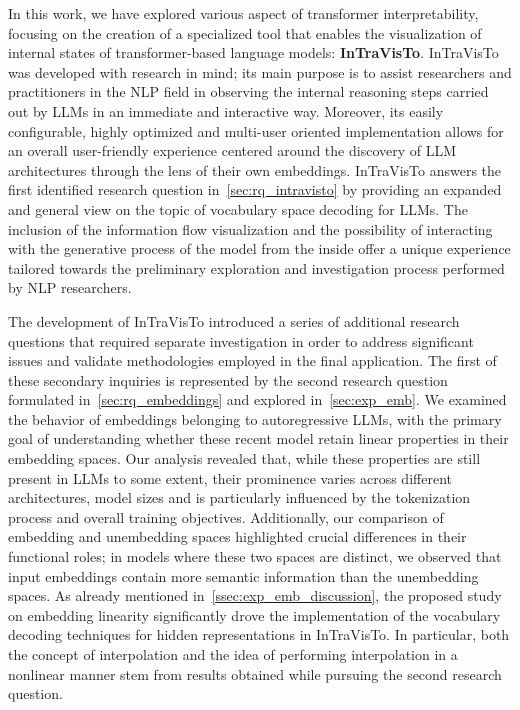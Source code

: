 In this work, we have explored various aspect of transformer interpretability, focusing on the creation of a specialized tool that enables the visualization of internal states of transformer-based language models: \textbf{InTraVisTo}.
InTraVisTo was developed with research in mind; its main purpose is to assist researchers and practitioners in the NLP field in observing the internal reasoning steps carried out by LLMs in an immediate and interactive way.
Moreover, its easily configurable, highly optimized and multi-user oriented implementation allows for an overall user-friendly experience centered around the discovery of LLM architectures through the lens of their own embeddings.
InTraVisTo answers the first identified research question in~\cref{sec:rq_intravisto} by providing an expanded and general view on the topic of vocabulary space decoding for LLMs.
The inclusion of the information flow visualization and the possibility of interacting with the generative process of the model from the inside offer a unique experience tailored towards the preliminary exploration and investigation process performed by NLP researchers.

The development of InTraVisTo introduced a series of additional research questions that required separate investigation in order to address significant issues and validate methodologies employed in the final application.
The first of these secondary inquiries is represented by the second research question formulated in~\cref{sec:rq_embeddings} and explored in~\cref{sec:exp_emb}.
We examined the behavior of embeddings belonging to autoregressive LLMs, with the primary goal of understanding whether these recent model retain linear properties in their embedding spaces.
Our analysis revealed that, while these properties are still present in LLMs to some extent, their prominence varies across different architectures, model sizes and is particularly influenced by the tokenization process and overall training objectives.
Additionally, our comparison of embedding and unembedding spaces highlighted crucial differences in their functional roles; in models where these two spaces are distinct, we observed that input embeddings contain more semantic information than the unembedding spaces.
As already mentioned in~\cref{ssec:exp_emb_discussion}, the proposed study on embedding linearity significantly drove the implementation of the vocabulary decoding techniques for hidden representations in InTraVisTo.
In particular, both the concept of interpolation and the idea of performing interpolation in a nonlinear manner stem from results obtained while pursuing the second research question.

